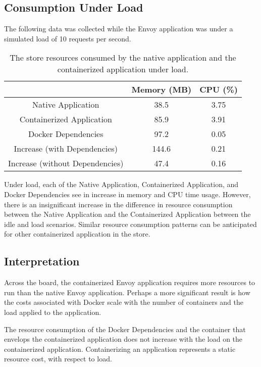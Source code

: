 \documentclass{article}
\begin{document}
\subsection{Consumption Under Load}
The following data was collected while the Envoy application was under a simulated load of 10 requests per second.

\begin{table}[H]
\begin{tabular}{ |c|c|c| }
 \hline
   & Memory (MB) & CPU (\%) \\ 
 \hline
 Native Application & 38.5 & 3.75 \\
 \hline
 Containerized Application & 85.9 & 3.91 \\
 \hline
 Docker Dependencies & 97.2 & 0.05 \\
 \hline\hline
 Increase (with Dependencies) & 144.6 & 0.21 \\
 \hline
 Increase (without Dependencies) & 47.4 & 0.16 \\
 \hline
\end{tabular}
\caption{The store resources consumed by the native application and the containerized application under load.}
\label{consumption-under-load}
\end{table}

Under load, each of the Native Application, Containerized Application, and Docker Dependencies see in increase in memory and CPU time usage. However, there is an insignificant increase in the difference in resource consumption between the Native Application and the Containerized Application between the idle and load scenarios. Similar resource consumption patterns can be anticipated for other containerized application in the store.

\subsection{Interpretation}
Across the board, the containerized Envoy application requires more resources to run than the native Envoy application. Perhaps a more significant result is how the costs associated with Docker scale with the number of containers and the load applied to the application.

The resource consumption of the Docker Dependencies and the container that envelops the containerized application does not increase with the load on the containerized application. Containerizing an application represents a static resource cost, with respect to load.
\end{document}
